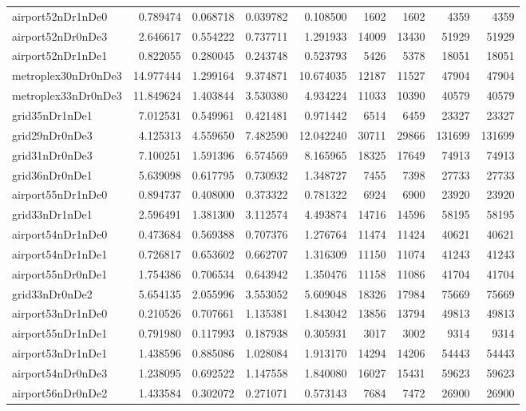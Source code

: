 \begin{longtable}{|l|r|r|r|r|r|r|r|r|}
airport52nDr1nDe0 & 0.789474 & 0.068718 & 0.039782 & 0.108500 & 1602 & 1602 & 4359 & 4359 \\
airport52nDr0nDe3 & 2.646617 & 0.554222 & 0.737711 & 1.291933 & 14009 & 13430 & 51929 & 51929 \\
airport52nDr1nDe1 & 0.822055 & 0.280045 & 0.243748 & 0.523793 & 5426 & 5378 & 18051 & 18051 \\
metroplex30nDr0nDe3 & 14.977444 & 1.299164 & 9.374871 & 10.674035 & 12187 & 11527 & 47904 & 47904 \\
metroplex33nDr0nDe3 & 11.849624 & 1.403844 & 3.530380 & 4.934224 & 11033 & 10390 & 40579 & 40579 \\
grid35nDr1nDe1 & 7.012531 & 0.549961 & 0.421481 & 0.971442 & 6514 & 6459 & 23327 & 23327 \\
grid29nDr0nDe3 & 4.125313 & 4.559650 & 7.482590 & 12.042240 & 30711 & 29866 & 131699 & 131699 \\
grid31nDr0nDe3 & 7.100251 & 1.591396 & 6.574569 & 8.165965 & 18325 & 17649 & 74913 & 74913 \\
grid36nDr0nDe1 & 5.639098 & 0.617795 & 0.730932 & 1.348727 & 7455 & 7398 & 27733 & 27733 \\
airport55nDr1nDe0 & 0.894737 & 0.408000 & 0.373322 & 0.781322 & 6924 & 6900 & 23920 & 23920 \\
grid33nDr1nDe1 & 2.596491 & 1.381300 & 3.112574 & 4.493874 & 14716 & 14596 & 58195 & 58195 \\
airport54nDr1nDe0 & 0.473684 & 0.569388 & 0.707376 & 1.276764 & 11474 & 11424 & 40621 & 40621 \\
airport54nDr1nDe1 & 0.726817 & 0.653602 & 0.662707 & 1.316309 & 11150 & 11074 & 41243 & 41243 \\
airport55nDr0nDe1 & 1.754386 & 0.706534 & 0.643942 & 1.350476 & 11158 & 11086 & 41704 & 41704 \\
grid33nDr0nDe2 & 5.654135 & 2.055996 & 3.553052 & 5.609048 & 18326 & 17984 & 75669 & 75669 \\
airport53nDr1nDe0 & 0.210526 & 0.707661 & 1.135381 & 1.843042 & 13856 & 13794 & 49813 & 49813 \\
airport55nDr1nDe1 & 0.791980 & 0.117993 & 0.187938 & 0.305931 & 3017 & 3002 & 9314 & 9314 \\
airport53nDr1nDe1 & 1.438596 & 0.885086 & 1.028084 & 1.913170 & 14294 & 14206 & 54443 & 54443 \\
airport54nDr0nDe3 & 1.238095 & 0.692522 & 1.147558 & 1.840080 & 16027 & 15431 & 59623 & 59623 \\
airport56nDr0nDe2 & 1.433584 & 0.302072 & 0.271071 & 0.573143 & 7684 & 7472 & 26900 & 26900 \\

\end{longtable}
